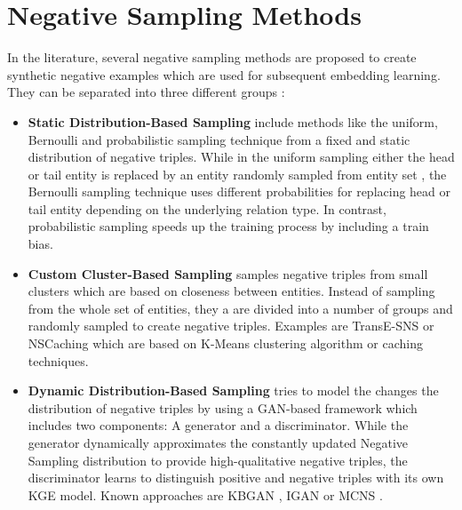\section{Negative Sampling Methods} \label{sec:negativesamplingmethods}
In the literature, several negative sampling methods are proposed to create synthetic negative examples which are used for subsequent embedding learning.
They can be separated into three different groups \cite{qianunderstanding}:
\begin{itemize}
    \item 
    \textbf{Static Distribution-Based Sampling} include methods like the uniform, Bernoulli and probabilistic sampling technique from a fixed and static distribution of negative triples.
	While in the uniform sampling either the head or tail entity is replaced by an entity randomly sampled from entity set \entities,
	the Bernoulli sampling technique uses different probabilities for replacing head or tail entity depending on the underlying relation type.
	In contrast, probabilistic sampling speeds up the training process by including a train bias.
	
	\item 
    \textbf{Custom Cluster-Based Sampling} samples negative triples from small clusters which are based on closeness between entities.
    Instead of sampling from the whole set of entities, they a are divided into a number of groups and randomly sampled to create negative triples. Examples are TransE-\ac{SNS} \cite{TransE-SNS} or \ac{NSCaching} \cite{zhang2019nscaching} which are based on K-Means clustering algorithm or caching techniques. 
    
    \item 
    \textbf{Dynamic Distribution-Based Sampling} tries to model the changes the distribution of negative triples by using a \ac{GAN}-based framework which includes two components: A generator and a discriminator.
	While the generator dynamically approximates the constantly updated Negative Sampling distribution to provide high-qualitative negative triples, 
	the discriminator learns to distinguish positive and negative triples with its own \ac{KGE} model.
	Known approaches are \ac{KBGAN} \cite{cai2017kbgan}, \ac{IGAN}  \cite{IGAN} or \ac{MCNS} \cite{MCNS}.
\end{itemize}


